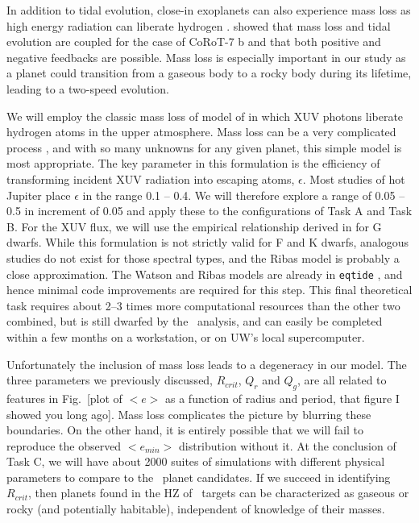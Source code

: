 \medskip
{\centerline{}}
\smallskip

In addition to tidal evolution, close-in exoplanets can also
experience mass loss as high energy radiation can liberate hydrogen
\citep{Watson81,VidalMadjar04}. \cite{Jackson10} showed that mass loss
and tidal evolution are coupled for the case of CoRoT-7 b and that
both positive and negative feedbacks are possible. Mass loss is
especially important in our study as a planet could transition from a
gaseous body to a rocky body during its lifetime, leading to a
two-speed evolution.

We will employ the classic mass loss of model of \cite{Watson81} in
which XUV photons liberate hydrogen atoms in the upper
atmosphere. Mass loss can be a very complicated process
\citep{Yelle04,Lammer07,Khodachenko07,Lammer10,Leitzinger11}, and with
so many unknowns for any given planet, this simple model is most
appropriate. The key parameter in this formulation is the efficiency
of transforming incident XUV radiation into escaping atoms,
$\epsilon$. Most studies of hot Jupiter place $\epsilon$ in the range
0.1 -- 0.4. We will therefore explore a range of 0.05 -- 0.5 in
increment of 0.05 and apply these to the configurations of Task A and
Task B. For the XUV flux, we will use the empirical relationship
derived in \cite{Ribas05} for G dwarfs. While this formulation is not
strictly valid for F and K dwarfs, analogous studies do not exist for
those spectral types, and the Ribas \etal model is probably a close
approximation. The Watson \etal and Ribas \etal models are already in
\texttt{eqtide} \citep{Barnes12}, and hence minimal code improvements
are required for this step. This final theoretical task requires about
2--3 times more computational resources than the other two combined,
but is still dwarfed by the \kepler~analysis, and can easily be
completed within a few months on a workstation, or on UW's local
supercomputer.

Unfortunately the inclusion of mass loss leads to a degeneracy in our
model. The three parameters we previously discussed, $R_{crit}$, $Q_r$
and $Q_g$, are all related to features in Fig.~[plot of $<e>$ as a
  function of radius and period, that figure I showed you long
  ago]. Mass loss complicates the picture by blurring these
boundaries. On the other hand, it is entirely possible that we will
fail to reproduce the observed $<e_{min}>$ distribution without it. At
the conclusion of Task C, we will have about 2000 suites of
simulations with different physical parameters to compare to the
\kepler~planet candidates. If we succeed in identifying $R_{crit}$,
then planets found in the HZ of \kepler~targets can be characterized
as gaseous or rocky (and potentially habitable), independent of
knowledge of their masses.

